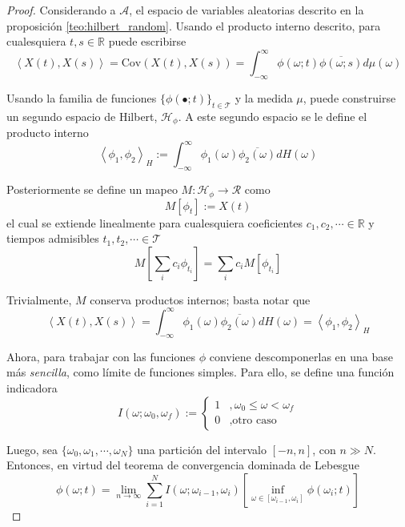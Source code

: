 \documentclass[12pt,letterpaper]{book}
\newcommand{\R}{\mathbb{R}}
\newcommand{\intR}{\int_{-\infty}^{\infty}}
\newcommand{\Cov}[1]{\mathrm{Cov}\left( #1 \right)}
\newcommand{\pint}[1]{\left\langle #1 \right\rangle}
\begin{document}
\newpage
\begin{proof}
Considerando a $\mathcal{A}$, el espacio de variables aleatorias descrito en la proposición \ref{teo:hilbert_random}. 
%
Usando el producto interno descrito, para cualesquiera $t,s\in\R$ puede escribirse
\begin{equation}
\pint{X(t),X(s)} = \Cov{X(t),X(s)} = \intR \phi(\omega; t) \overline{\phi(\omega; s)} d\mu(\omega)
\end{equation} 

Usando la familia de funciones $\{ \phi(\bullet; t) \}_{t\in \mathcal{T}}$ y la medida $\mu$, puede construirse un segundo espacio de Hilbert, $\mathcal{H}_\phi$.
%
A este segundo espacio se le define el producto interno
\begin{equation}
\pint{\phi_1,\phi_2}_H := \intR \phi_1(\omega) \overline{\phi_2(\omega)} dH(\omega)
\end{equation} 

Posteriormente se define un mapeo $M : \mathcal{H}_\phi \rightarrow \mathcal{R}$ como
\begin{equation}
M[\phi_t] := X(t)
\end{equation}
el cual se extiende linealmente para cualesquiera coeficientes $c_1, c_2, \cdots \in \R$ y tiempos admisibles $t_1, t_2, \cdots \in \mathcal{T}$
\begin{equation}
M\left[ \sum_i c_i \phi_{t_i} \right] = \sum_i c_i M\left[ \phi_{t_i} \right]
\end{equation}

Trivialmente, $M$ conserva productos internos; basta notar que
\begin{equation}
\pint{X(t),X(s)} = \intR \phi_1(\omega) \overline{\phi_2(\omega)} dH(\omega) = \pint{\phi_1,\phi_2}_H
\end{equation}

Ahora, para trabajar con las funciones $\phi$ conviene descomponerlas en una base más \textit{sencilla}, como límite de funciones simples. Para ello, se define una función indicadora
\begin{equation}
I(\omega; \omega_0, \omega_f) := \begin{cases}
1 &, \omega_0 \leq \omega < \omega_f \\
0 &, \text{otro caso}
\end{cases}
\end{equation}

Luego, sea $\{\omega_0, \omega_1, \cdots, \omega_N\}$ una partición del intervalo $[-n,n]$, con $n\gg N$. Entonces, en virtud del teorema de convergencia dominada de Lebesgue
\begin{equation}
\phi(\omega; t) = \lim_{n\rightarrow\infty} \sum_{i=1}^{N} I(\omega; \omega_{i-1}, \omega_i) \left[  \inf_{\omega \in [\omega_{i-1},\omega_i]} \phi(\omega_{i}; t)\right]
\label{asd}
\end{equation}


\end{proof}
\end{document}
